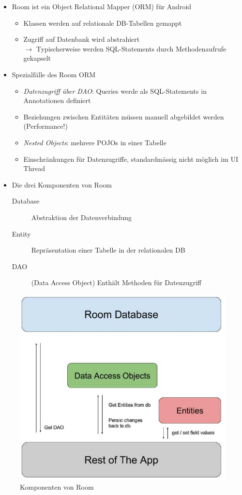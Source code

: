 \documentclass[a4paper]{article}
\begin{document}
\begin{itemize}
	\item Room ist ein Object Relational Mapper (ORM) für Android
		\begin{itemize}
			\item Klassen werden auf relationale DB-Tabellen gemappt
			\item Zugriff auf Datenbank wird abstrahiert\\
			$\rightarrow$ Typischerweise werden SQL-Statements durch Methodenaufrufe gekapselt
		\end{itemize}
	\item Spezialfälle des Room ORM
		\begin{itemize}
			\item \textit{Datenzugriff über DAO}: Queries werde als SQL-Statements in Annotationen definiert
			\item Beziehungen zwischen Entitäten müssen manuell abgebildet werden (Performance!)
			\item \textit{Nested Objects}: mehrere POJOs in einer Tabelle
			\item Einschränkungen für Datenzugriffe, standardmässig nicht möglich im UI Thread
		\end{itemize}
	\item Die drei Komponenten von Room
		\begin{description}
			\item[Database] Abstraktion der Datenverbindung
			\item[Entity] Repräsentation einer Tabelle in der relationalen DB
			\item[DAO] (Data Access Object) Enthält Methoden für Datenzugriff
		\end{description}
\end{itemize}

\begin{figure}[htb!]
	\centering
	\includegraphics[width=.5\textwidth]{img/room_components.jpg}
	\caption{Komponenten von Room}
\end{figure}
\end{document}
